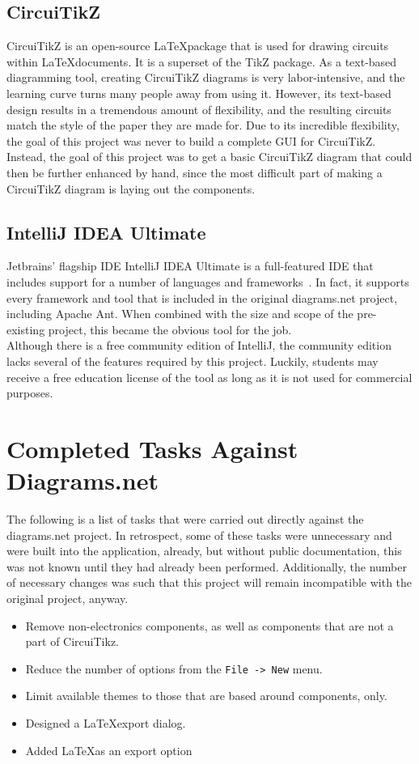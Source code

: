 \subsection{CircuiTikZ}\label{subsec:circuitikz}
CircuiTikZ is an open-source \LaTeX package that is used for drawing circuits within \LaTeX documents.
It is a superset of the TikZ package.
As a text-based diagramming tool, creating CircuiTikZ diagrams is very labor-intensive, and the learning curve turns many people away from using it.
However, its text-based design results in a tremendous amount of flexibility, and the resulting circuits match the style of the paper they are made for.
Due to its incredible flexibility, the goal of this project was never to build a complete GUI for CircuiTikZ.
Instead, the goal of this project was to get a basic CircuiTikZ diagram that could then be further enhanced by hand, since the most difficult part of making a CircuiTikZ diagram is laying out the components.

\subsection{IntelliJ IDEA Ultimate}\label{subsec:intellij}
Jetbrains' flagship IDE IntelliJ IDEA Ultimate is a full-featured IDE that includes support for a number of languages and frameworks~\cite{intellij}.
In fact, it supports every framework and tool that is included in the original diagrams.net project, including Apache Ant.
When combined with the size and scope of the pre-existing project, this became the obvious tool for the job.\\

Although there is a free community edition of IntelliJ, the community edition lacks several of the features required by this project.
Luckily, students may receive a free education license of the tool as long as it is not used for commercial purposes.


\section{Completed Tasks Against Diagrams.net}\label{sec:completed-tasks}
The following is a list of tasks that were carried out directly against the diagrams.net project.
In retrospect, some of these tasks were unnecessary and were built into the application, already, but without public documentation, this was not known until they had already been performed.
Additionally, the number of necessary changes was such that this project will remain incompatible with the original project, anyway.
\begin{itemize}
 \item Remove non-electronics components, as well as components that are not a part of CircuiTikz.
 \item Reduce the number of options from the \texttt{File -> New} menu.
 \item Limit available themes to those that are based around components, only.
 \item Designed a \LaTeX export dialog.
 \item Added \LaTeX as an export option
\end{itemize}

